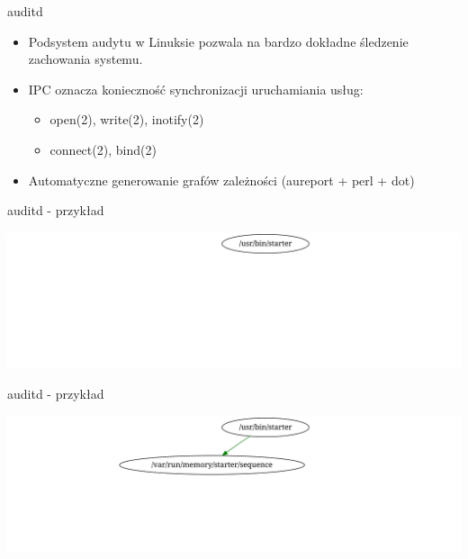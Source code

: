 \documentclass[presentation,aspectratio=43,12pt]{beamer}
\begin{document}
\begin{frame}[label=sec-6-5]{auditd}
\begin{itemize}
\item Podsystem audytu w Linuksie pozwala na bardzo dokładne śledzenie
zachowania systemu.

\item <2-> IPC oznacza konieczność synchronizacji uruchamiania usług:
\begin{itemize}
\item open(2), write(2), inotify(2)
\item connect(2), bind(2)
\end{itemize}

\item <3-> Automatyczne generowanie grafów zależności (aureport + perl + dot)
\end{itemize}


\end{frame}
\begin{frame}[label=sec-6-6]{auditd - przykład}
\begin{center}
\includegraphics[width=\textwidth]{images/auditd-0}
\end{center}
\end{frame}
\begin{frame}[label=sec-6-7]{auditd - przykład}
\begin{center}
\includegraphics[width=\textwidth]{images/auditd-1}
\end{center}
\end{frame}
\end{document}
